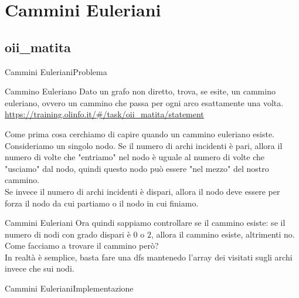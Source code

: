\documentclass[compress]{beamer}
\begin{document}
\section{Cammini Euleriani}
\subsection{oii\_matita}
\begin{frame}{Cammini Euleriani}{Problema}
    \begin{exampleblock}{Cammino Euleriano}
        Dato un grafo non diretto, trova, se esite, un cammino euleriano, ovvero un cammino che passa per ogni arco esattamente una volta.
    \small{\underline{\url{https://training.olinfo.it/\#/task/oii_matita/statement}}}
    \end{exampleblock}
    \vfill
    \pause
    Come prima cosa cerchiamo di capire quando un cammino euleriano esiste.\\
    \pause
    \vfill
    Consideriamo un singolo nodo. Se il numero di archi incidenti \`e pari, allora il numero di volte che "entriamo" 
    nel nodo \`e uguale al numero di volte che "usciamo" dal nodo, quindi questo nodo può essere "nel mezzo" del nostro cammino.\\
    \pause
    Se invece il numero di archi incidenti \`e dispari, allora il nodo deve essere per forza il nodo da cui partiamo o il nodo in cui finiamo.\\
\end{frame}

\begin{frame}{Cammini Euleriani}
    Ora quindi sappiamo controllare se il cammino esiste: se il numero di nodi con grado dispari \`e $0$ o $2$, allora il cammino esiste, altrimenti no.\\
    \pause
    \vfill
    Come facciamo a trovare il cammino però?\\
    \pause
    \vfill
    In realtà \`e semplice, basta fare una dfs mantenedo l'array dei visitati sugli archi invece che sui nodi.\\
\end{frame}

\begin{frame}{Cammini Euleriani}{Implementazione}
\end{frame}
\end{document}
